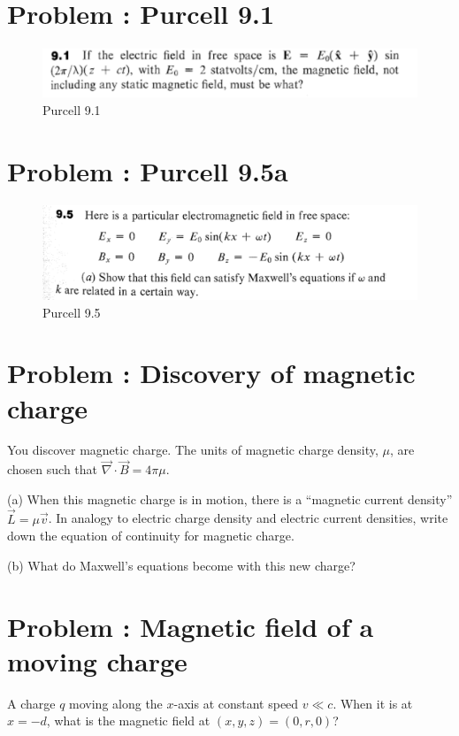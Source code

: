 \documentclass[problems]{esg8022pset}
\date{\today }
\begin{document}
\section{Problem \thesection: Purcell 9.1}

\begin{figure}[H]
    \centering
    \includegraphics[width = 15cm]{pu901}
    \caption{Purcell 9.1}
  \end{figure}
  
\section{Problem \thesection: Purcell 9.5a}
 \begin{figure}[H]
    \centering
    \includegraphics[width = 15cm]{pu905}
    \caption{Purcell 9.5}
  \end{figure}
\section{Problem \thesection: Discovery of magnetic charge}
You discover magnetic
charge.  The units of magnetic charge density,
$\mu$, are chosen such that $\vec\nabla\cdot\vec B = 4\pi\mu$.

\par\noindent (a) When this magnetic charge is in motion,
there is a ``magnetic current density'' $\vec L = \mu \vec v$.  In
analogy to electric charge density and electric current densities,
write down the equation of continuity for magnetic charge.

\par\noindent (b) What do Maxwell's equations become with this
new charge?
\section{Problem \thesection:  Magnetic field of a moving charge}
A charge $q$ moving
along the $x$-axis at constant speed $v \ll c$.  When it is at $x =
-d$, what is the magnetic field at $(x,y,z) = (0,r,0)$?
\end{document}

